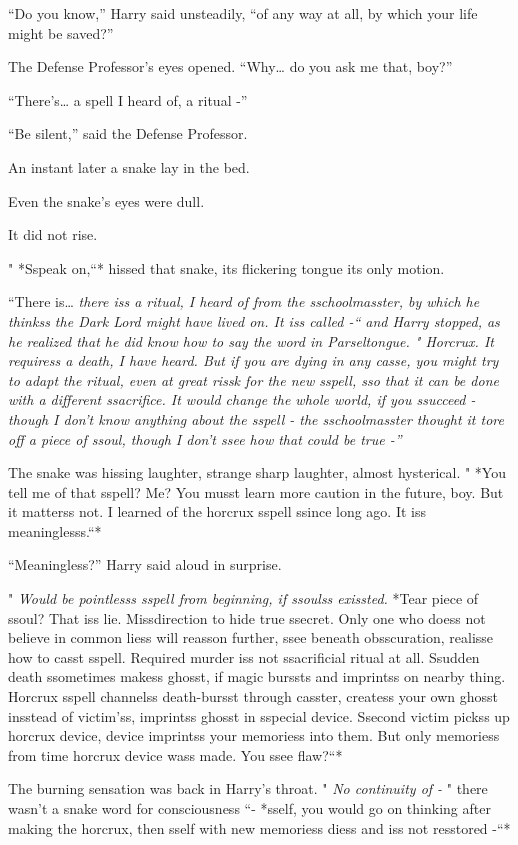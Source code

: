 ``Do you know,'' Harry said unsteadily, ``of any way at all, by which
your life might be saved?''

The Defense Professor's eyes opened. ``Why\ldots{} do you ask me that,
boy?''

``There's\ldots{} a spell I heard of, a ritual -''

``Be silent,'' said the Defense Professor.

An instant later a snake lay in the bed.

Even the snake's eyes were dull.

It did not rise.

" *Sspeak on,``* hissed that snake, its flickering tongue its only
motion.

``There is\ldots{} \emph{there iss a ritual, I heard of from the
sschoolmasster, by which he thinkss the Dark Lord might have lived on.
It iss called -``\emph{ and Harry stopped, as he realized that he did
know how to say the word in Parseltongue. " }Horcrux. It requiress a
death, I have heard. But if you are dying in any casse, you might try to
adapt the ritual, even at great rissk for the new sspell, sso that it
can be done with a different ssacrifice. It would change the whole
world, if you ssucceed - though I don't know anything about the sspell -
the sschoolmasster thought it tore off a piece of ssoul, though I don't
ssee how that could be true -''}

The snake was hissing laughter, strange sharp laughter, almost
hysterical. " *You tell me of that sspell? Me? You musst learn more
caution in the future, boy. But it matterss not. I learned of the
horcrux sspell ssince long ago. It iss meaninglesss.``*

``Meaningless?'' Harry said aloud in surprise.

" \emph{Would be pointlesss sspell from beginning, if ssoulss exissted.}
*Tear piece of ssoul? That iss lie. Missdirection to hide true ssecret.
Only one who doess not believe in common liess will reasson further,
ssee beneath obsscuration, realisse how to casst sspell. Required murder
iss not ssacrificial ritual at all. Ssudden death ssometimes makess
ghosst, if magic burssts and imprintss on nearby thing. Horcrux sspell
channelss death-bursst through casster, createss your own ghosst
insstead of victim'ss, imprintss ghosst in sspecial device. Ssecond
victim pickss up horcrux device, device imprintss your memoriess into
them. But only memoriess from time horcrux device wass made. You ssee
flaw?``*

The burning sensation was back in Harry's throat. " \emph{No continuity
of -} " there wasn't a snake word for consciousness ``- *sself, you
would go on thinking after making the horcrux, then sself with new
memoriess diess and iss not resstored -``*

